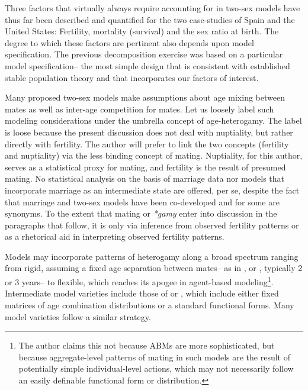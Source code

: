 \FloatBarrier
Three factors that virtually always require accounting for in two-sex models
have thus far been described and quantified for the two case-studies of Spain and
the United States: Fertility, mortality (survival) and the sex ratio at birth.
The degree to which these factors are pertinent also depends upon model 
specification. The previous decomposition exercise was based on a particular
model specification-- the most simple design that is consistent with
established stable population theory and that incorporates our factors of
interest. 

Many proposed two-sex models make assumptions about age mixing between
mates as well as inter-age competition for mates. Let us loosely 
label such modeling considerations under the umbrella concept of
age-heterogamy. The label is loose because the present
discussion does not deal with nuptiality, but rather directly with fertility.
The author will prefer to link the two concepts (fertility and nuptiality) via
the less binding concept of mating. Nuptiality, for this author, serves as a
statistical proxy for mating, and fertility is the result of presumed mating. No 
statistical analysis on the basis of
marriage data nor models that incorporate marriage as an intermediate state are
offered, per se, despite the fact that marriage and two-sex models have
been co-developed and for some are synonyms. To the extent that mating or
\textit{*gamy} enter into discussion in the paragraphs that follow, it is only
via inference from observed fertility patterns or as a rhetorical aid in interpreting observed fertility patterns.

Models may incorporate patterns of heterogamy along a
broad spectrum ranging from rigid, assuming a fixed age separation between mates--
 as in \citet{cabre1997tortulos}, \citet{karmel1947relations} or \citet{akers1967measuring}, 
 typically 2 or 3 years-- to flexible, which reaches its apogee in agent-based
modeling\footnote{The author claims this not because ABMs are more
sophisticated, but because aggregate-level patterns of mating in such models are
the result of potentially simple individual-level actions, which may not
necessarily follow an easily definable functional form or distribution.}.
Intermediate model varieties include those of \citet[e.g.]{gupta1972two} or
\citet{schoen1981harmonic}, which include either fixed matrices of age
combination distributions or a standard functional forms. Many model varieties
follow a similar strategy.  


